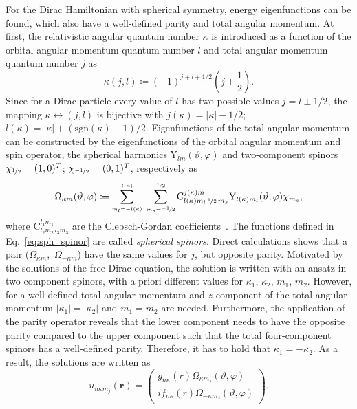 For the Dirac Hamiltonian with spherical symmetry, energy eigenfunctions can be found, which also have a well-defined parity and total angular momentum. At first, the relativistic angular quantum number $\kappa$ is introduced as a function of the orbital angular momentum quantum number $l$ and total angular momentum quantum number $j$ as
\begin{equation}
\kappa(j,l) \coloneqq (-1)^{j+l+1/2} \left(j+\frac{1}{2}\right).
\end{equation}
Since for a Dirac particle every value of $l$ has two possible values $j=l\pm 1/2$, the mapping $\kappa \leftrightarrow (j,l)$ is bijective with $j(\kappa)=|\kappa|-1/2$; $l(\kappa)=|\kappa|+(\mathrm{sgn}(\kappa)-1)/2$. Eigenfunctions of the total angular momentum can be constructed by the eigenfunctions of the orbital angular momentum and spin operator, the spherical harmonics $\text{Y}_{lm}(\vartheta,\varphi)$ and two-component spinors $\chi_{\nicefrac{1}{2}}=(1,0)^T$; $\chi_{\nicefrac{-1}{2}}=(0,1)^T$, respectively as
\begin{equation}
\Omega_{\kappa m}(\vartheta,\varphi)\coloneqq
\sum_{{\scriptscriptstyle {m_l}{=}{-l(\kappa)}}}^{\scriptscriptstyle l(\kappa)}\;
\sum_{{\scriptscriptstyle {m_s}{=}{\nicefrac{-1}{2}}}}^{\scriptscriptstyle \nicefrac{1}{2}}
\text{C}^{j(\kappa)m}_{l(\kappa)m_l\,\nicefrac{1}{2}\,m_s}
\text{Y}_{l(\kappa)m_l}(\vartheta,\varphi)\chi_{m_s},
\label{eq:sph_spinor}
\end{equation}
where $\text{C}^{l_1m_1}_{l_2m_2\,l_3m_3}$ are the Clebsch-Gordan coefficients~\cite{varshalovich1988}. The functions defined in Eq.~\eqref{eq:sph_spinor} are called \textit{spherical spinors}. Direct calculations shows that a pair \mbox{($\Omega_{\kappa m}$, $\Omega_{-\kappa m}$)} have the same values for $j$, but opposite parity. Motivated by the solutions of the free Dirac equation, the solution is written with an ansatz in two component spinors, with a priori different values for $\kappa_1$, $\kappa_2$, $m_1$, $m_2$. 
However, for a well defined total angular momentum and $z$-component of the total angular momentum $|\kappa_1|=|\kappa_2|$ and $m_1=m_2$ are needed. Furthermore, the application of the parity operator reveals that the lower component needs to have the opposite parity compared to the upper component such that the total four-component spinors has a well-defined parity. Therefore, it has to hold that $\kappa_1=-\kappa_2$. As a result, the solutions are written as
\begin{equation}
u_{n\kappa m_j}(\mathbf{r})=
\begin{pmatrix}
g_{n\kappa}(r)\Omega_{\kappa m_j}(\vartheta,\varphi)\\
i f_{n\kappa}(r) \Omega_{-\kappa m_j}(\vartheta,\varphi)
\end{pmatrix}.
\label{eq:ansatz_dirac}
\end{equation}

